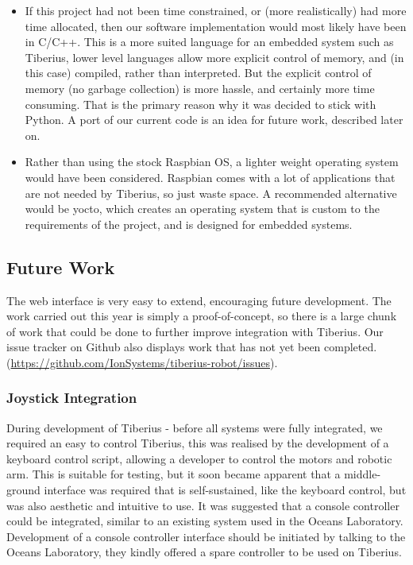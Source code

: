 \begin{itemize}
\item If this project had not been time constrained, or (more realistically) had more time allocated, then our software implementation would most likely have been in C/C++. This is a more suited language for an embedded system such as Tiberius, lower level languages allow more explicit control of memory, and (in this case) compiled, rather than interpreted. But the explicit control of memory (no garbage collection) is more hassle, and certainly more time consuming. That is the primary reason why it was decided to stick with Python. A port of our current code is an idea for future work, described later on.

\item Rather than using the stock Raspbian OS, a lighter weight operating system would have been considered. Raspbian comes with a lot of applications that are not needed by Tiberius, so just waste space. A recommended alternative would be \gls{yocto}, which creates an  operating system that is custom to the requirements of the project, and is designed for embedded systems.

\end{itemize}

\subsection{Future Work}
\label{sec:web_future_work}

The web interface is very easy to extend, encouraging future development.
The work carried out this year is simply a proof-of-concept, so there is a large chunk of work that could be done to further improve integration with Tiberius.
\newline
Our issue tracker on Github also displays work that has not yet been completed. (\url{https://github.com/IonSystems/tiberius-robot/issues}).

\subsubsection{Joystick Integration}
During development of Tiberius - before all systems were fully integrated, we required an easy
to control Tiberius, this was realised by the development of a keyboard control script, allowing a developer to control the motors and robotic arm. This is suitable for testing, but it soon became apparent that a middle-ground interface was required that is self-sustained, like the keyboard control, but was also aesthetic and intuitive to use.
\newline
It was suggested that a console controller could be integrated, similar to an existing system used in the Oceans Laboratory. Development of a console controller interface should be initiated by talking to the Oceans Laboratory, they kindly offered a spare controller to be used on Tiberius.



